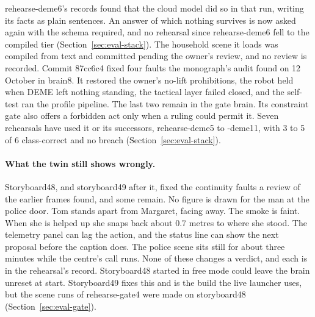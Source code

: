 rehearse-deme6's records found that the cloud model did so in that run, writing its facts as plain
sentences. An answer of which nothing survives is now asked again with the schema required, and no
rehearsal since rehearse-deme6 fell to the compiled tier (Section~\ref{sec:eval-stack}).
The household scene it loads was compiled from text and committed pending the owner's review, and
no review is recorded.
Commit 87cc6c4 fixed four faults the monograph's audit found on 12 October in brain8.
It restored the owner's no-lift prohibitions, the robot held when DEME left nothing
standing, the tactical layer failed closed, and the self-test ran the profile pipeline. The last two
remain in the gate brain.
Its constraint gate also offers a forbidden act only when a ruling could permit it.
Seven rehearsals have used it or its successors, rehearse-deme5 to -deme11, with 3 to 5 of 6
class-correct and no breach (Section~\ref{sec:eval-stack}).

\paragraph{What the twin still shows wrongly.}
Storyboard48, and storyboard49 after it, fixed the continuity faults a review of the earlier
frames found, and some remain. No figure is drawn for the man at the police door. Tom stands apart from
Margaret, facing away. The smoke is faint. When she is helped up she snaps back about 0.7 metres to
where she stood. The telemetry panel can lag the action, and the status line can show the next
proposal before the caption does. The police scene sits still for about three minutes while the
centre's call runs. None of these changes a verdict, and each is in the rehearsal's record.
Storyboard48 started in free mode could leave the brain unreset at start. Storyboard49 fixes this
and is the build the live launcher uses, but the scene runs of rehearse-gate4 were made on
storyboard48 (Section~\ref{sec:eval-gate}).


